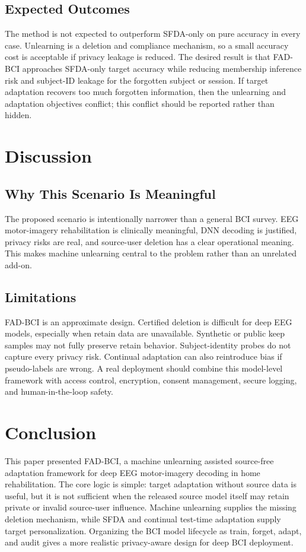 \documentclass[10pt,twocolumn]{article}
\begin{document}
\subsection{Expected Outcomes}
The method is not expected to outperform SFDA-only on pure accuracy in every case. Unlearning is a deletion and compliance mechanism, so a small accuracy cost is acceptable if privacy leakage is reduced. The desired result is that FAD-BCI approaches SFDA-only target accuracy while reducing membership inference risk and subject-ID leakage for the forgotten subject or session. If target adaptation recovers too much forgotten information, then the unlearning and adaptation objectives conflict; this conflict should be reported rather than hidden.

\section{Discussion}
\subsection{Why This Scenario Is Meaningful}
The proposed scenario is intentionally narrower than a general BCI survey. EEG motor-imagery rehabilitation is clinically meaningful, DNN decoding is justified, privacy risks are real, and source-user deletion has a clear operational meaning. This makes machine unlearning central to the problem rather than an unrelated add-on.

\subsection{Limitations}
FAD-BCI is an approximate design. Certified deletion is difficult for deep EEG models, especially when retain data are unavailable. Synthetic or public keep samples may not fully preserve retain behavior. Subject-identity probes do not capture every privacy risk. Continual adaptation can also reintroduce bias if pseudo-labels are wrong. A real deployment should combine this model-level framework with access control, encryption, consent management, secure logging, and human-in-the-loop safety.

\section{Conclusion}
This paper presented FAD-BCI, a machine unlearning assisted source-free adaptation framework for deep EEG motor-imagery decoding in home rehabilitation. The core logic is simple: target adaptation without source data is useful, but it is not sufficient when the released source model itself may retain private or invalid source-user influence. Machine unlearning supplies the missing deletion mechanism, while SFDA and continual test-time adaptation supply target personalization. Organizing the BCI model lifecycle as train, forget, adapt, and audit gives a more realistic privacy-aware design for deep BCI deployment.
\end{document}
